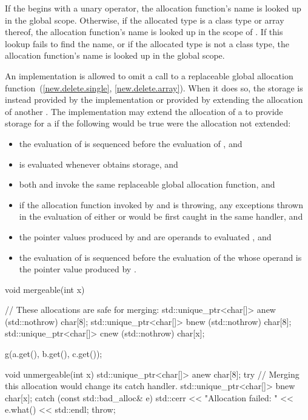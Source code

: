 \pnum
{}%
If the  begins with a unary \tcode{::}
operator, the allocation function's name is looked up in the global
scope. Otherwise, if the allocated type is a class type  or
array thereof, the allocation function's name is looked up in the scope
of . If this lookup fails to find the name, or if the allocated
type is not a class type, the allocation function's name is looked up in
the global scope.

\pnum
An implementation is allowed to omit a call to a replaceable global allocation
function~(\ref{new.delete.single}, \ref{new.delete.array}). When it does so,
the storage is instead provided by the implementation or provided by extending
the allocation of another . The implementation may
extend the allocation of a   to provide
storage for a   if the
following would be true were the allocation not extended:

\begin{itemize}
\item the evaluation of  is sequenced before the evaluation of
, and

\item {} is evaluated whenever  obtains storage, and

\item both  and  invoke the same replaceable global
allocation function, and

\item if the allocation function invoked by  and  is
throwing, any exceptions thrown in the evaluation of either  or
 would be first caught in the same handler, and

\item the pointer values produced by  and  are operands to
evaluated , and

\item the evaluation of  is sequenced before the evaluation of the
 whose operand is the pointer value produced
by .
\end{itemize}

\enterexample
\begin{codeblock}
  void mergeable(int x) {
    // These allocations are safe for merging:
    std::unique_ptr<char[]> a{new (std::nothrow) char[8]};
    std::unique_ptr<char[]> b{new (std::nothrow) char[8]};
    std::unique_ptr<char[]> c{new (std::nothrow) char[x]};

    g(a.get(), b.get(), c.get());
  }

  void unmergeable(int x) {
    std::unique_ptr<char[]> a{new char[8]};
    try {
      // Merging this allocation would change its catch handler.
      std::unique_ptr<char[]> b{new char[x]};
    } catch (const std::bad_alloc& e) {
      std::cerr << "Allocation failed: " << e.what() << std::endl;
      throw;
    }
  }
\end{codeblock}
\exitexample

